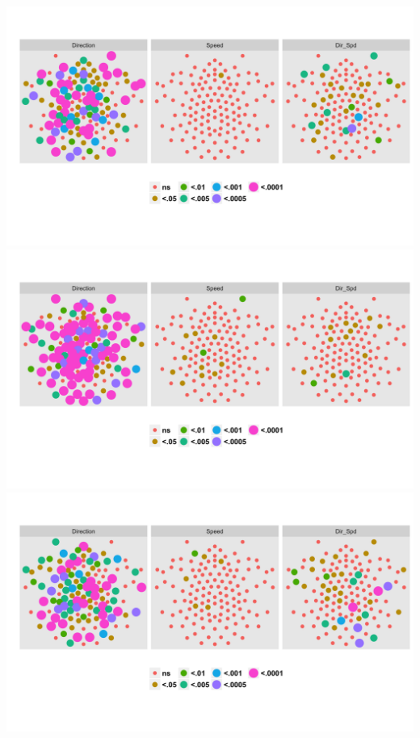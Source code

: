\documentclass[landscape,final,paperwidth=72in,paperheight=42in,fontscale=0.285]{baposter}
\begin{document}
\begin{poster}
{      \begin{center}
        \includegraphics[scale=0.3]{../../figs/1F1/analyze-and-plot-main-effects-1.png}
        \includegraphics[scale=0.3]{../../figs/2F1/analyze-and-plot-main-effects-1.png}
        \includegraphics[scale=0.3]{../../figs/3F1/analyze-and-plot-main-effects-1.png}


\end{center}}
\end{poster}
\end{document}
